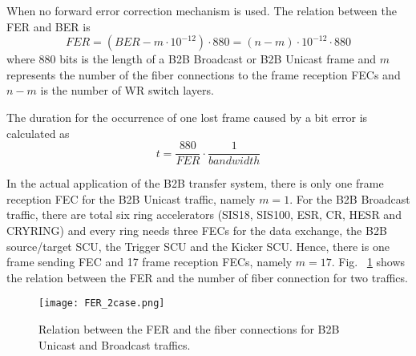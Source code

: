 When no forward error correction mechanism is used. The relation between the FER and BER is
\begin{equation}
\label{m-n}
	FER=(BER-m\cdot10^{-12})\cdot 880=(n-m)\cdot10^{-12}\cdot 880
\end{equation}
where 880 bits is the length of a B2B Broadcast or B2B Unicast frame and $m$ represents the number of the fiber connections to the frame reception FECs and $n-m$ is the number of WR switch layers.  

The duration for the occurrence of one lost frame caused by a bit error is calculated as 
\begin{equation}
\label{duration}
	t=\frac{880}{FER}\cdot \frac{1}{bandwidth}
\end{equation}
 
In the actual application of the B2B transfer system, there is only one frame reception FEC for the B2B Unicast traffic, namely $m=1$. For the B2B Broadcast traffic, there are total six ring accelerators (SIS18, SIS100, ESR, CR, HESR and CRYRING) and every ring needs three FECs for the data exchange, the B2B source/target SCU, the Trigger SCU and the Kicker SCU. Hence, there is one frame sending FEC and 17 frame reception FECs, namely $m=17$. Fig. ~\ref{FER_2case} shows the relation between the FER and the number of fiber connection for two traffics.   
\begin{figure}[H]
   \centering   
   \texttt{[image: FER\_2case.png]}
   \caption{Relation between the FER and the fiber connections for B2B Unicast and Broadcast traffics.}
   \label{FER_2case}
\end{figure}


